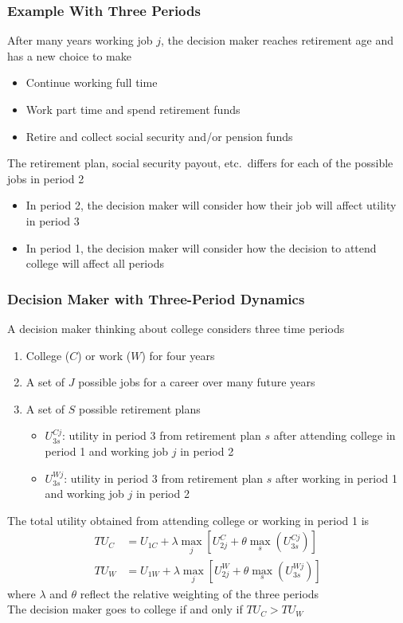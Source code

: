 \documentclass{beamer}
\begin{document}
\begin{frame}\frametitle{Example With Three Periods}
    After many years working job $j$, the decision maker reaches retirement age and has a new choice to make
    \begin{itemize}
    	\item Continue working full time
    	\item Work part time and spend retirement funds
    	\item Retire and collect social security and/or pension funds
    \end{itemize}
    \vspace{2ex}
    The retirement plan, social security payout, etc.\ differs for each of the possible jobs in period 2
    \begin{itemize}
    	\item In period 2, the decision maker will consider how their job will affect utility in period 3
    	\item In period 1, the decision maker will consider how the decision to attend college will affect all periods
    \end{itemize}
\end{frame}

\begin{frame}\frametitle{Decision Maker with Three-Period Dynamics}
    A decision maker thinking about college considers three time periods
    \begin{enumerate}
        \item College ($C$) or work ($W$) for four years
        \item A set of $J$ possible jobs for a career over many future years
        \item A set of $S$ possible retirement plans
        \begin{itemize}
        	\item $U_{3s}^{Cj}$: utility in period 3 from retirement plan $s$ after attending college in period 1 and working job $j$ in period 2
            \item $U_{3s}^{Wj}$: utility in period 3 from retirement plan $s$ after working in period 1 and working job $j$ in period 2
        \end{itemize}
    \end{enumerate}
    \vspace{1ex}
    The total utility obtained from attending college or working in period 1 is
    \begin{align*}
        TU_C &= U_{1C} + \lambda \max_j \left[ U_{2j}^C + \theta \max_s (U_{3s}^{Cj}) \right] \\
        TU_W &= U_{1W} + \lambda \max_j \left[ U_{2j}^W + \theta \max_s (U_{3s}^{Wj}) \right]
    \end{align*}
    where $\lambda$ and $\theta$ reflect the relative weighting of the three periods \\
    \vspace{1ex}
    The decision maker goes to college if and only if $TU_C > TU_W$
\end{frame}
\end{document}
